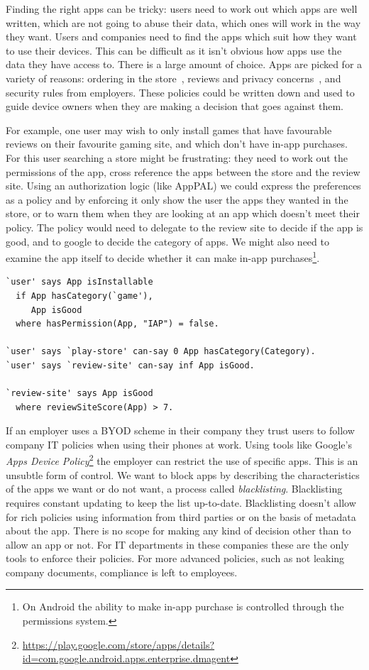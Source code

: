 \documentclass[a4paper]{scrartcl}
\begin{document}
Finding the right apps can be tricky:
  users need to work out which apps are well written, which are not going to abuse their data, which ones will work in the way they want.
Users and companies need to find the apps which suit how they want to use their devices.
This can be difficult as it isn't obvious how apps use the data they have access to.
There is a large amount of choice.
Apps are picked for a variety of reasons:
  ordering in the store~\citep{Prata:2012in},
  reviews and privacy concerns~\citep{Kelley:2013kc},
  and security rules from employers.
These policies could be written down and used to guide device owners when they are making a decision that goes against them.

For example, one user may wish to only install games that have favourable reviews on their favourite gaming site, and which don't have in-app purchases.
For this user searching a store might be frustrating: they need to work out the permissions of the app, cross reference the apps between the store and the review site.
Using an authorization logic (like AppPAL) we could express the preferences as a policy and by enforcing it only show the user the apps they wanted in the store, or to warn them when they are looking at an app which doesn't meet their policy.
The policy would need to delegate to the review site to decide if the app is good, and to google to decide the category of apps.
We might also need to examine the app itself to decide whether it can make in-app purchases\footnote{On Android the ability to make in-app purchase is controlled through the permissions system.}.
\begin{lstlisting}
`user' says App isInstallable
  if App hasCategory(`game'),
     App isGood
  where hasPermission(App, "IAP") = false.

`user' says `play-store' can-say 0 App hasCategory(Category).
`user' says `review-site' can-say inf App isGood.

`review-site' says App isGood
  where reviewSiteScore(App) > 7.
\end{lstlisting}

If an employer uses a \ac{BYOD} scheme in their company they trust users to follow company IT policies when using their phones at work.
Using tools like Google's \emph{Apps Device Policy}\footnote{\url{https://play.google.com/store/apps/details?id=com.google.android.apps.enterprise.dmagent}} the employer can restrict the use of specific apps.
This is an unsubtle form of control.
We want to block apps by describing the characteristics of the apps we want or do not want, a process called \emph{blacklisting}.
Blacklisting requires constant updating to keep the list up-to-date.
Blacklisting doesn't allow for rich policies using information from third parties or on the basis of metadata about the app.
There is no scope for making any kind of decision other than to allow an app or not.
For IT departments in these companies these are the only tools to enforce their policies.
For more advanced policies, such as not leaking company documents, compliance is left to employees.
\end{document}
